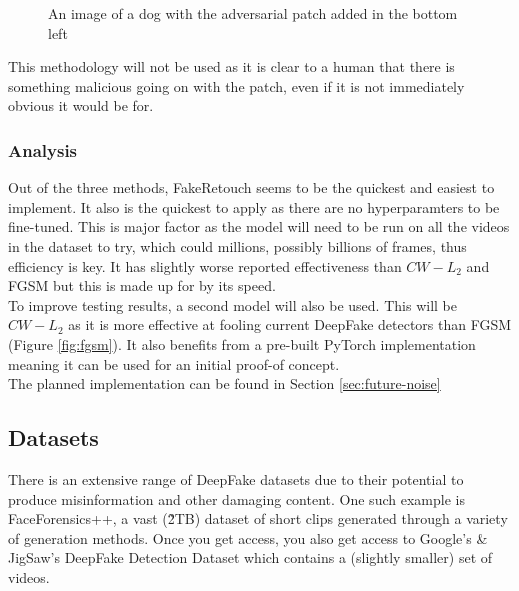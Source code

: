 \documentclass{article}
\begin{document}
\begin{figure}[H]
    \centering
    \caption{An image of a dog with the adversarial patch added in the bottom left\cite{brown2017adversarial}}
\end{figure}

This methodology will not be used as it is clear to a human that there is something malicious going on with the patch, even if it is not immediately obvious it would be for.

\subsubsection{Analysis}

Out of the three methods, FakeRetouch seems to be the quickest and easiest to implement. It also is the quickest to apply as there are no hyperparamters to be fine-tuned\cite{huang2020fakeretouch}. This is major factor as the model will need to be run on all the videos in the dataset to try, which could millions, possibly billions of frames, thus efficiency is key. It has slightly worse reported effectiveness than $CW-L_2$ and FGSM but this is made up for by its speed.\\

To improve testing results, a second model will also be used. This will be $CW-L_2$ as it is more effective at fooling current DeepFake detectors than FGSM (Figure \ref{fig:fgsm}). It also benefits from a pre-built PyTorch implementation \cite{cwl2python} meaning it can be used for an initial proof-of concept.\\

The planned implementation can be found in Section \ref{sec:future-noise}

\subsection{Datasets}

There is an extensive range of DeepFake datasets due to their potential to produce misinformation and other damaging content. One such example is FaceForensics++\cite{roessler2019faceforensicspp}, a vast (\~2TB) dataset of short clips generated through a variety of generation methods. Once you get access, you also get access to Google's \& JigSaw's DeepFake Detection Dataset\cite{DDD_GoogleJigSaw2019} which contains a (slightly smaller) set of videos.\\
\end{document}
